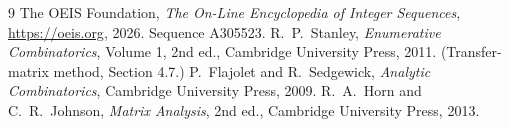 \documentclass[11pt,a4paper]{article}
\theoremstyle{plain}
\theoremstyle{definition}
\begin{document}
\begin{thebibliography}{9}
 The OEIS Foundation, \emph{The On-Line Encyclopedia of Integer
Sequences}, \url{https://oeis.org}, 2026. Sequence A305523.
 R.~P.~Stanley, \emph{Enumerative Combinatorics}, Volume 1, 2nd ed.,
Cambridge University Press, 2011. (Transfer-matrix method, Section 4.7.)
 P.~Flajolet and R.~Sedgewick, \emph{Analytic Combinatorics}, Cambridge
University Press, 2009.
 R.~A.~Horn and C.~R.~Johnson, \emph{Matrix Analysis}, 2nd ed., Cambridge
University Press, 2013.
\end{thebibliography}
\end{document}
